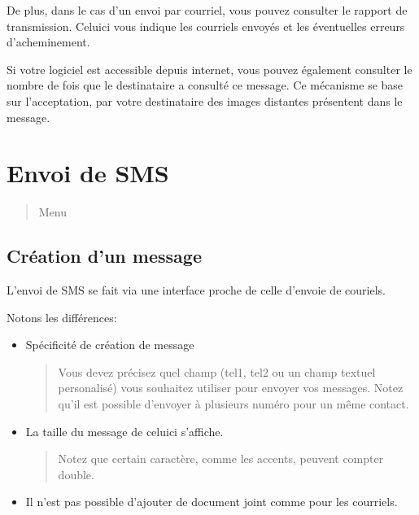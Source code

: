 \documentclass[a4paper,10pt,oneside,french]{sphinxmanual}
\begin{document}
\sphinxAtStartPar
De plus, dans le cas d’un envoi par courriel, vous pouvez consulter le rapport de transmission. Celui\sphinxhyphen{}ci vous indique les courriels envoyés et les éventuelles erreurs d’acheminement.

\sphinxAtStartPar
Si votre logiciel est accessible depuis internet, vous pouvez également consulter le nombre de fois que le destinataire a consulté ce message.
Ce mécanisme se base sur l’acceptation, par votre destinataire des images distantes présentent dans le message.

\noindent{}

\sphinxstepscope


\section{Envoi de SMS}
\label{\detokenize{mailing/sms:envoi-de-sms}}\label{\detokenize{mailing/sms::doc}}\begin{quote}

\sphinxAtStartPar
Menu 
\end{quote}


\subsection{Création d’un message}
\label{\detokenize{mailing/sms:creation-d-un-message}}
\sphinxAtStartPar
L’envoi de SMS se fait via une interface proche de celle d’envoie de couriels.

\sphinxAtStartPar
Notons les différences:
\begin{itemize}
\item {} 
\sphinxAtStartPar
Spécificité de création de message
\begin{quote}

\sphinxAtStartPar
Vous devez précisez quel champ (tel1, tel2 ou un champ textuel personalisé) vous souhaitez utiliser pour envoyer vos messages.
Notez qu’il est possible d’envoyer à plusieurs numéro pour un même contact.
\end{quote}

\item {} 
\sphinxAtStartPar
La taille du message de celui\sphinxhyphen{}ci s’affiche.
\begin{quote}

\sphinxAtStartPar
Notez que certain caractère, comme les accents, peuvent compter double.
\end{quote}

\item {} 
\sphinxAtStartPar
Il n’est pas possible d’ajouter de document joint comme pour les courriels.

\end{itemize}
\end{document}
